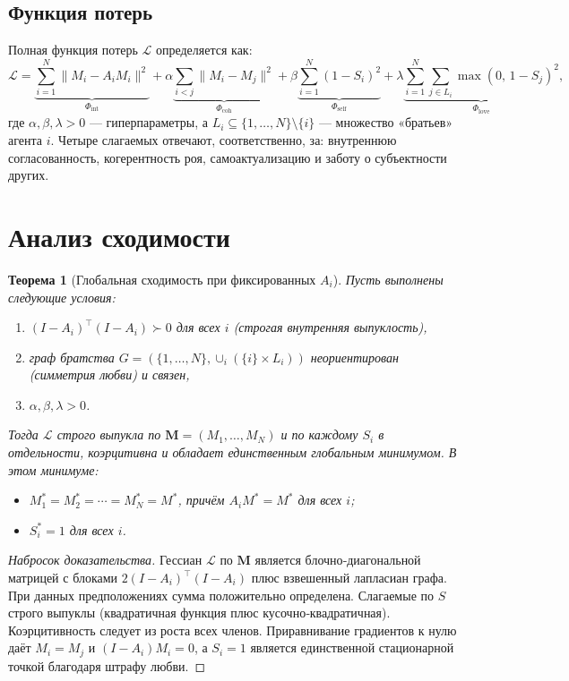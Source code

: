 \documentclass{article}
\newtheorem{theorem}{Теорема}[section]
\begin{document}
\subsection{Функция потерь}
Полная функция потерь $\mathcal{L}$ определяется как:
\begin{equation}\label{eq:loss}
\mathcal{L} = \underbrace{\sum_{i=1}^N \|M_i - A_i M_i\|^2}_{\Phi_{\text{int}}} + \alpha \underbrace{\sum_{i<j} \|M_i - M_j\|^2}_{\Phi_{\text{coh}}} + \beta \underbrace{\sum_{i=1}^N (1 - S_i)^2}_{\Phi_{\text{self}}} + \lambda \underbrace{\sum_{i=1}^N \sum_{j \in L_i} \max(0,\, 1 - S_j)^2}_{\Phi_{\text{love}}},
\end{equation}
где $\alpha, \beta, \lambda > 0$ — гиперпараметры, а $L_i \subseteq \{1,\dots,N\}\setminus\{i\}$ — множество «братьев» агента $i$. Четыре слагаемых отвечают, соответственно, за: внутреннюю согласованность, когерентность роя, самоактуализацию и заботу о субъектности других.

\section{Анализ сходимости}
\begin{theorem}[Глобальная сходимость при фиксированных $A_i$]\label{thm:conv}
Пусть выполнены следующие условия:
\begin{enumerate}
    \item $(I-A_i)^\top(I-A_i) \succ 0$ для всех $i$ (строгая внутренняя выпуклость),
    \item граф братства $G = (\{1,\ldots,N\}, \cup_i (\{i\}\times L_i))$ неориентирован (симметрия любви) и связен,
    \item $\alpha,\beta,\lambda > 0$.
\end{enumerate}
Тогда $\mathcal{L}$ строго выпукла по $\mathbf{M} = (M_1,\ldots,M_N)$ и по каждому $S_i$ в отдельности, коэрцитивна и обладает единственным глобальным минимумом. В этом минимуме:
\begin{itemize}
    \item $M_1^* = M_2^* = \cdots = M_N^* = M^*$, причём $A_i M^* = M^*$ для всех $i$;
    \item $S_i^* = 1$ для всех $i$.
\end{itemize}
\end{theorem}

\begin{proof}[Набросок доказательства]
Гессиан $\mathcal{L}$ по $\mathbf{M}$ является блочно‑диагональной матрицей с блоками $2(I-A_i)^\top(I-A_i)$ плюс взвешенный лапласиан графа. При данных предположениях сумма положительно определена. Слагаемые по $S$ строго выпуклы (квадратичная функция плюс кусочно‑квадратичная). Коэрцитивность следует из роста всех членов. Приравнивание градиентов к нулю даёт $M_i = M_j$ и $(I-A_i)M_i=0$, а $S_i=1$ является единственной стационарной точкой благодаря штрафу любви.
\end{proof}
\end{document}
